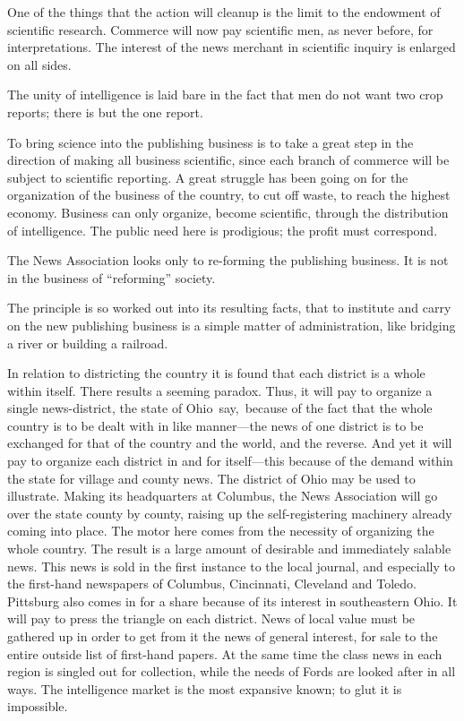 \documentclass[openany,nobib]{tufte-book}
\begin{document}
One of the things that the action will cleanup is the limit to the
endowment of scientific research. Commerce will now pay scientific men,
as never before, for interpretations. The interest of the news merchant
in scientific inquiry is enlarged on all sides.~

The unity of intelligence is laid bare in the fact that men do not want
two crop reports; there is but the one report.~

To bring science into the publishing business is to take a great step in
the direction of making all business scientific, since each branch of
commerce will be subject to scientific reporting. A great struggle has
been going on for the organization of the business of the country, to
cut off waste, to reach the highest economy. Business can only organize,
become scientific, through the distribution of intelligence. The public
need here is prodigious; the profit must correspond.~

The News Association looks only to re-forming the publishing business.
It is not in the business of ``reforming'' society.~

The principle is so worked out into its resulting facts, that to
institute and carry on the new publishing business is a simple matter of
administration, like bridging a river or building a railroad.~~

In relation to districting the country it is found that each district is
a whole within itself. There results a seeming paradox. Thus, it will
pay to organize a single news-district, the state of Ohio~say,~because
of the fact that the whole country is to be dealt with in like
manner---the news of one district is to be exchanged for that of the
country and the world, and the reverse. And yet it will pay to organize
each district in and for itself---this because of the demand within the
state for village and county news. The district of Ohio may be used to
illustrate. Making its headquarters at Columbus, the News Association
will go over the state county by county, raising up the self-registering
machinery already coming into place. The motor here comes from the
necessity of organizing the whole country. The result is a large amount
of desirable and immediately salable news. This news is sold in the
first instance to the local journal, and especially to the first-hand
newspapers of Columbus, Cincinnati, Cleveland and Toledo. Pittsburg also
comes in for a share because of its interest in southeastern Ohio. It
will pay to press the triangle on each district. News of local value
must be gathered up in order to get from it the news of general
interest, for sale to the entire outside list of first-hand papers. At
the same time the class news in each region is singled out for
collection, while the needs of Fords are looked after in all ways. The
intelligence market is the most expansive known; to glut it is
impossible.~
\end{document}
